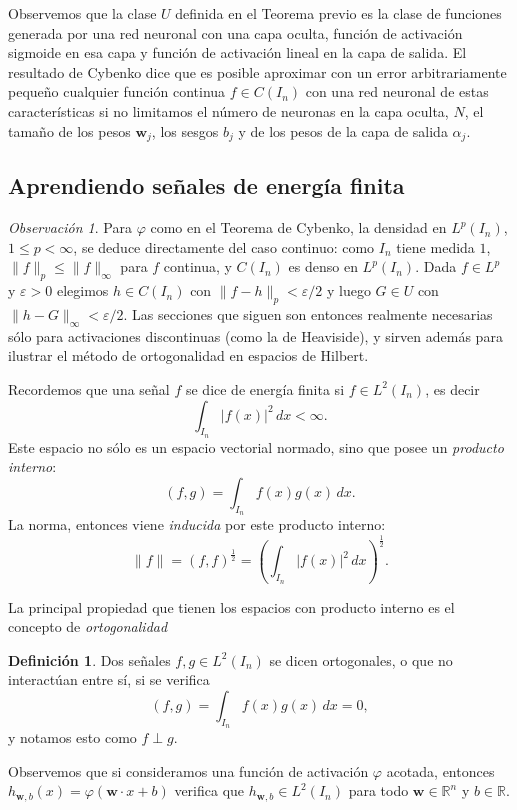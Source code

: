 \documentclass[12pt, a4paper]{amsbook}
\newcommand{\ve}{\varepsilon}
\newcommand{\R}{{\mathbb R}}
\newcommand{\ww}{{\mathbf w}}
\theoremstyle{remark}
\newtheorem{obs}[teo]{Observaci\'on}
\theoremstyle{definition}
\newtheorem{defi}[teo]{Definici\'on}
\numberwithin{section}{chapter}
\numberwithin{subsection}{section}
\numberwithin{equation}{section}
\numberwithin{figure}{chapter}
\begin{document}
Observemos que la clase $U$ definida en el Teorema previo es la clase de funciones generada por una red neuronal con una capa oculta, función de activación sigmoide en esa capa y función de activación lineal en la capa de salida. El resultado de Cybenko dice que es posible aproximar con un error arbitrariamente pequeño cualquier función continua $f\in C(I_n)$ con una red neuronal de estas características si no limitamos el número de neuronas en la capa oculta, $N$, el tamaño de los pesos $\ww_j$, los sesgos $b_j$ y de los pesos de la capa de salida $\alpha_j$.


\subsection{Aprendiendo señales de energía finita}

\begin{obs}
Para $\varphi$ como en el Teorema de Cybenko, la densidad en $L^p(I_n)$, $1\le p<\infty$, se deduce directamente del caso continuo: como $I_n$ tiene medida $1$, $\|f\|_p\le\|f\|_\infty$ para $f$ continua, y $C(I_n)$ es denso en $L^p(I_n)$. Dada $f\in L^p$ y $\ve>0$ elegimos $h\in C(I_n)$ con $\|f-h\|_p<\ve/2$ y luego $G\in U$ con $\|h-G\|_\infty<\ve/2$. Las secciones que siguen son entonces realmente necesarias sólo para activaciones discontinuas (como la de Heaviside), y sirven además para ilustrar el método de ortogonalidad en espacios de Hilbert.
\end{obs}

Recordemos que una señal $f$ se dice de energía finita si $f\in L^2(I_n)$, es decir
$$
\int_{I_n} |f(x)|^2\, dx <\infty.
$$
Este espacio no sólo es un espacio vectorial normado, sino que posee un {\em producto interno}:
$$
(f, g) = \int_{I_n} f(x) g(x)\, dx.
$$
La norma, entonces viene {\em inducida} por este producto interno:
$$
\|f\| = (f, f)^\frac12 = \left(\int_{I_n} |f(x)|^2\, dx\right)^\frac12.
$$

La principal propiedad que tienen los espacios con producto interno es el concepto de {\em ortogonalidad}
\begin{defi}
Dos señales $f, g\in L^2(I_n)$ se dicen ortogonales, o que no interactúan entre sí, si se verifica
$$
(f, g) = \int_{I_n} f(x) g(x)\, dx = 0,
$$
y notamos esto como $f\perp g$.
\end{defi}

Observemos que si consideramos una función de activación $\varphi$ acotada, entonces $h_{\ww, b}(x) = \varphi(\ww\cdot x + b)$ verifica que $h_{\ww, b}\in L^2(I_n)$ para todo $\ww\in\R^n$ y $b\in\R$.
\end{document}
